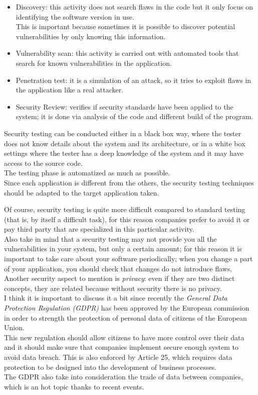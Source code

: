 \documentclass[12pt]{report}
\begin{document}
{\begin{itemize}
  \item Discovery: this activity does not search flaws in the code but it only focus on identifying the software version in use.\\
This is important because sometimes it is possible to discover potential vulnerabilities by only knowing this information.
  \item Vulnerability scan: this activity is carried out with automated tools that search for
  known vulnerabilities in the application.
  \item Penetration test: it is a simulation of an attack, so it tries to exploit flaws in the application like a real attacker.
  \item Security Review: verifies if security standards have been applied to the system; it is done via analysis of the code and different build of the program.
\end{itemize}


Security testing can be conducted either in a black box way, where the tester does not know details about the system and its architecture, or
in a white box settings where the tester has a deep knowledge of the system and it may have access to the source code.\\
The testing phase is automatized as much as possible.\\
Since each application is different from the others, the security testing techniques should be adapted to the target application taken.

Of course, security testing is quite more difficult compared to standard testing (that is, by itself a difficult task), for this reason companies prefer to avoid it or pay third party that are specialized in this particular activity.\\
Also take in mind that a security testing may not provide you all the vulnerabilities in your system, but only a certain amount; for this reason it
is important to take care about your software periodically; when you change a part of your application, you should check that changes do not
introduce flaws.\\

Another security aspect to mention is \emph{privacy}: even if they are two distinct concepts, they are related because without security there is no privacy.\\
I think it is important to discuss it a bit since recently the \emph{General Data Protection Regulation (GDPR)} has been approved by the European commission in order to strength the protection of personal data of citizens of the European Union.\\
This new regulation should allow citizens to have more control over their data and it should make sure that companies implement secure enough system to avoid data breach. This is also enforced by Article 25, which requires data protection to be designed into the development of business processes\cite{wikica}.\\
The GDPR also take into consideration the trade of data between companies, which is an hot topic thanks to recent events\cite{ca}.\\


}
\end{document}
